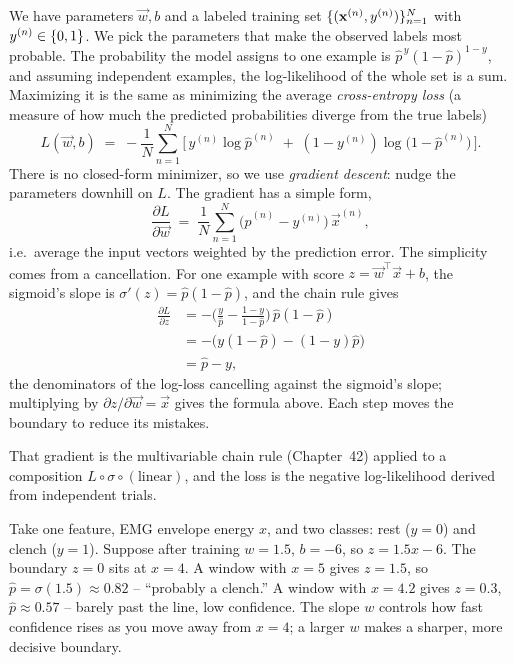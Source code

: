 We have parameters $\vec{w}, b$ and a labeled training set
$\{(\mathbf{x}^{(n)}, y^{(n)})\}_{n=1}^{N}$ with $y^{(n)} \in \{0,1\}$. We pick the
parameters that make the observed labels most probable. The probability the model
assigns to one example is $\hat{p}^{\,y}(1-\hat{p})^{1-y}$, and assuming independent
examples, the log-likelihood of the whole set is a sum. Maximizing it is the same as
minimizing the average \emph{cross-entropy loss} (a measure of how much the predicted probabilities diverge from the true labels)
\[
  L(\vec{w},b) \;=\; -\frac{1}{N}\sum_{n=1}^{N}
     \Big[\, y^{(n)} \log \hat{p}^{(n)} \;+\; (1-y^{(n)}) \log\!\big(1-\hat{p}^{(n)}\big) \,\Big].
\]
There is no closed-form minimizer, so we use \emph{gradient descent}: nudge the
parameters downhill on $L$. The gradient has a simple form,
\[
  \frac{\partial L}{\partial \vec{w}}
   \;=\; \frac{1}{N}\sum_{n=1}^{N} \big(\hat{p}^{(n)} - y^{(n)}\big)\,\vec{x}^{(n)},
\]
i.e.\ average the input vectors weighted by the prediction error. The simplicity comes
from a cancellation. For one example with score $z=\vec{w}^\top\vec{x}+b$, the sigmoid's
slope is $\sigma'(z) = \hat{p}(1-\hat{p})$, and the chain rule gives
\begin{align*}
  \frac{\partial L}{\partial z}
  &= -\Big(\frac{y}{\hat{p}} - \frac{1-y}{1-\hat{p}}\Big)\,\hat{p}(1-\hat{p}) \\
  &= -\big(y(1-\hat{p}) - (1-y)\hat{p}\big) \\
  &= \hat{p} - y ,
\end{align*}
the denominators of the log-loss cancelling against the sigmoid's slope; multiplying by
$\partial z/\partial\vec{w} = \vec{x}$ gives the formula above. Each step moves the
boundary to reduce its mistakes.

\begin{connectionbox}
That gradient is the multivariable chain rule (Chapter~42) applied to a composition
$L \circ \sigma \circ (\text{linear})$, and the loss is the negative log-likelihood derived from independent trials.
\end{connectionbox}

\begin{example}
\label{ch39:ex-logistic}
Take one feature, EMG envelope energy $x$, and two classes: rest ($y{=}0$) and
clench ($y{=}1$). Suppose after training $w = 1.5$, $b = -6$, so $z = 1.5x - 6$. The
boundary $z=0$ sits at $x = 4$. A window with $x=5$ gives $z=1.5$, so
$\hat{p}=\sigma(1.5)\approx 0.82$ -- ``probably a clench.'' A window with $x=4.2$ gives
$z=0.3$, $\hat{p}\approx 0.57$ -- barely past the line, low confidence. The slope $w$
controls how fast confidence rises as you move away from $x=4$; a larger $w$ makes a
sharper, more decisive boundary.
\end{example}

